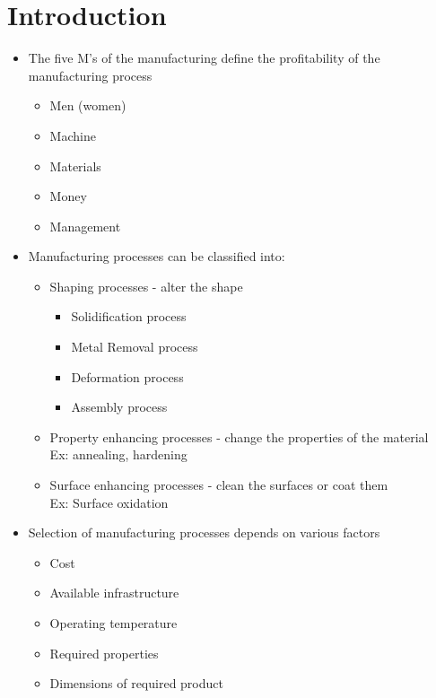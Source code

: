 \documentclass{article}
\title{}
\author{Vishal Neeli}
\begin{document}
\maketitle

\section{Introduction}

\begin{itemize}
	\item The five M's of the manufacturing define the profitability of the manufacturing process
	\begin{itemize}
		\item Men (women)
		\item Machine
		\item Materials
		\item Money 
		\item Management

	\end{itemize}

	\item Manufacturing processes can be classified into:
	\begin{itemize}
		\item Shaping processes - alter the shape
		\begin{itemize}
			\item Solidification process
			\item Metal Removal process
			\item Deformation process
			\item Assembly process
		\end{itemize}
		\item Property enhancing processes - change the properties of the material\\
		Ex: annealing, hardening
		\item Surface enhancing processes - clean the surfaces or coat them\\
		Ex: Surface oxidation
	\end{itemize}


	\item Selection of manufacturing processes depends on various factors
	\begin{itemize}
		\item Cost 
		\item Available infrastructure
		\item Operating temperature
		\item Required properties
		\item Dimensions of required product
	\end{itemize}

\end{itemize}
\end{document}
